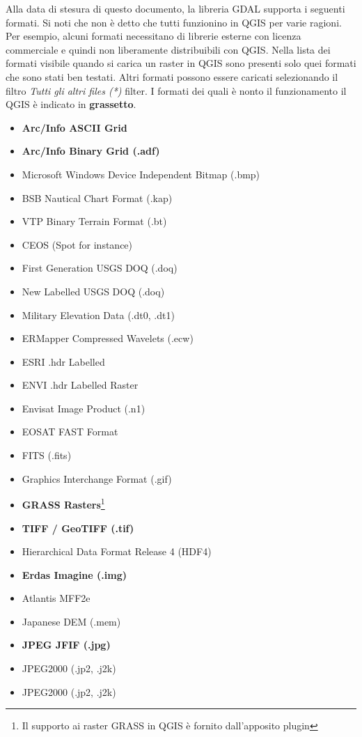 Alla data di stesura di questo documento, la libreria GDAL supporta i seguenti formati. Si noti che non è detto che tutti funzionino in QGIS per varie ragioni.
Per esempio, alcuni formati necessitano di librerie esterne con licenza commerciale e quindi non liberamente distribuibili con QGIS. Nella lista dei formati visibile quando si carica un raster in QGIS sono presenti solo quei formati che sono stati ben testati. Altri formati possono essere caricati selezionando il filtro \textsl{Tutti gli altri files (*)} filter. I formati dei quali è nonto il funzionamento il QGIS è indicato in \textbf{grassetto}.

\begin{itemize}
\item \textbf{Arc/Info ASCII Grid}
\item \textbf{Arc/Info Binary Grid (.adf)}
\item Microsoft Windows Device Independent Bitmap (.bmp)
\item BSB Nautical Chart Format (.kap)
\item VTP Binary Terrain Format (.bt)
\item CEOS (Spot for instance)
\item First Generation USGS DOQ (.doq)
\item New Labelled USGS DOQ (.doq)
\item Military Elevation Data (.dt0, .dt1)
\item ERMapper Compressed Wavelets (.ecw)
\item ESRI .hdr Labelled
\item ENVI .hdr Labelled Raster
\item Envisat Image Product (.n1)
\item EOSAT FAST Format
\item FITS (.fits)
\item Graphics Interchange Format (.gif)
\item \textbf{GRASS Rasters}\footnote{Il supporto ai raster GRASS in QGIS è fornito dall'apposito plugin} 
\item \textbf{TIFF / GeoTIFF (.tif)}
\item Hierarchical Data Format Release 4 (HDF4)
\item \textbf{Erdas Imagine (.img)}
\item Atlantis MFF2e
\item Japanese DEM (.mem)
\item \textbf{JPEG JFIF (.jpg)}
\item JPEG2000 (.jp2, .j2k)
\item JPEG2000 (.jp2, .j2k)

\end{itemize}
